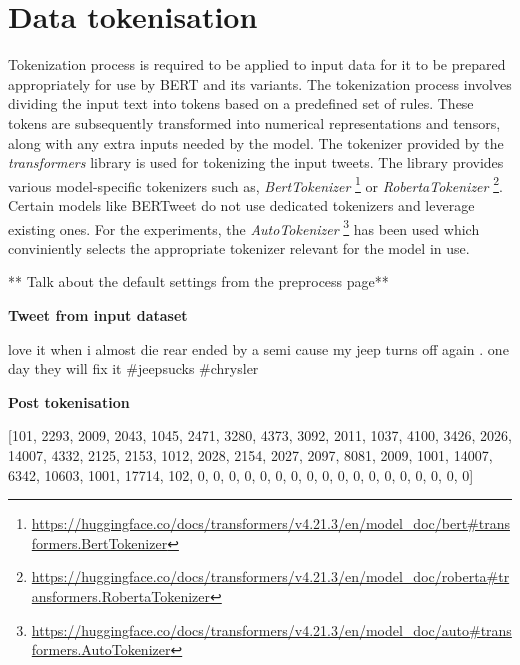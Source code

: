 \section{Data tokenisation}
Tokenization process is required to be applied to input data for it to be prepared appropriately for use by BERT and its variants. The tokenization process involves dividing the input text into tokens based on a predefined set of rules. These tokens are subsequently transformed into numerical representations and tensors, along with any extra inputs needed by the model. 
The tokenizer provided by the \textit{transformers} library is used for tokenizing the input tweets. The library provides various model-specific tokenizers such as, \textit{BertTokenizer} \footnote{\url{https://huggingface.co/docs/transformers/v4.21.3/en/model_doc/bert#transformers.BertTokenizer}} or \textit{RobertaTokenizer} \footnote{\url{https://huggingface.co/docs/transformers/v4.21.3/en/model_doc/roberta#transformers.RobertaTokenizer}}. Certain models like BERTweet do not use dedicated tokenizers and leverage existing ones. For the experiments, the \textit{AutoTokenizer} \footnote{\url{https://huggingface.co/docs/transformers/v4.21.3/en/model_doc/auto#transformers.AutoTokenizer}} has been used which conviniently selects the appropriate tokenizer relevant for the model in use. 
\newline\newline

** Talk about the default settings from the preprocess page**

\textbf{Tweet from input dataset}\newline

\begin{adjustbox}{minipage={\textwidth},fbox}
    love it when i almost die rear ended by a semi cause my jeep turns off again . one day they will fix it \#jeepsucks \#chrysler
\end{adjustbox} \newline\newline


\textbf{Post tokenisation}\newline

\begin{adjustbox}{minipage={\textwidth},fbox}
    [101, 2293, 2009, 2043, 1045, 2471, 3280, 4373, 3092, 2011, 1037, 4100, 3426, 2026, 14007, 4332, 2125, 2153, 1012, 2028, 2154, 2027, 2097, 8081, 2009, 1001, 14007, 6342, 10603, 1001, 17714, 102, 0, 0, 0, 0, 0, 0, 0, 0, 0, 0, 0, 0, 0, 0, 0, 0, 0, 0]
\end{adjustbox} \newline\newline

